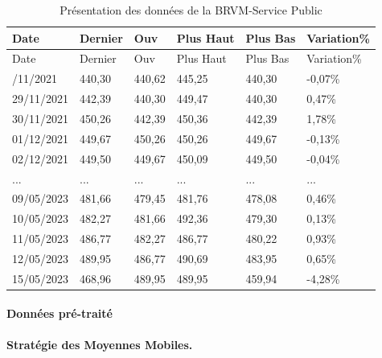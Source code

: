 \begin{itemize}
  \hypertarget{tab:multirow}{}
  \begin{longtable}[]{@{}llllll@{}}
  \caption{Présentation des données de la BRVM-Service
  Public}\tabularnewline
  \toprule\noalign{}
  Date & Dernier & Ouv & Plus Haut & Plus Bas & Variation\% \\
  \midrule\noalign{}
  \endfirsthead
  \toprule\noalign{}
  Date & Dernier & Ouv & Plus Haut & Plus Bas & Variation\% \\
  \midrule\noalign{}
  \endhead
  \bottomrule\noalign{}
  \endlastfoot
  26/11/2021 & 440,30 & 440,62 & 445,25 & 440,30 & -0,07\% \\
  29/11/2021 & 442,39 & 440,30 & 449,47 & 440,30 & 0,47\% \\
  30/11/2021 & 450,26 & 442,39 & 450,36 & 442,39 & 1,78\% \\
  01/12/2021 & 449,67 & 450,26 & 450,26 & 449,67 & -0,13\% \\
  02/12/2021 & 449,50 & 449,67 & 450,09 & 449,50 & -0,04\% \\
  ... & ... & ... & ... & ... & ... \\
  09/05/2023 & 481,66 & 479,45 & 481,76 & 478,08 & 0,46\% \\
  10/05/2023 & 482,27 & 481,66 & 492,36 & 479,30 & 0,13\% \\
  11/05/2023 & 486,77 & 482,27 & 486,77 & 480,22 & 0,93\% \\
  12/05/2023 & 489,95 & 486,77 & 490,69 & 483,95 & 0,65\% \\
  15/05/2023 & 468,96 & 489,95 & 489,95 & 459,94 & -4,28\% \\
  \end{longtable}
\end{itemize}

\paragraph{Données pré-traité}\label{donnuxe9es-pruxe9-traituxe9}

\textbf{Stratégie des Moyennes Mobiles.}

